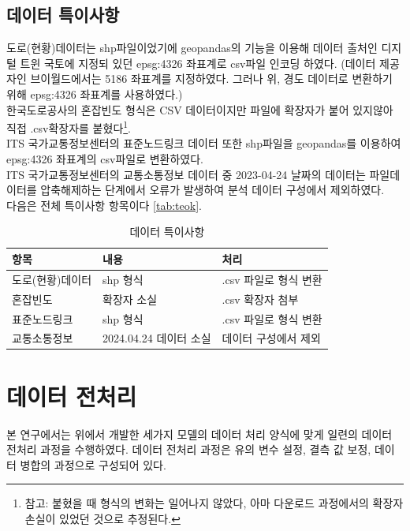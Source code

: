 \documentclass[11pt]{report}
\begin{document}
\subsection{데이터 특이사항}
도로(현황)데이터는 shp파일이었기에 geopandas의 기능을 이용해 데이터 출처인 디지털 트윈 국토에 지정되 있던 epsg:4326 좌표계로 csv파일 인코딩 하였다. 
(데이터 제공자인 브이월드에서는 5186 좌표계를 지정하였다. 그러나 위, 경도 데이터로 변환하기 위해 epsg:4326 좌표계를 사용하였다.) \\
\indent 한국도로공사의 혼잡빈도 형식은 CSV 데이터이지만 파일에 확장자가 붙어 있지않아 직접 .csv확장자를 붙혔다\footnote{참고: 붙혔을 때 형식의 변화는 일어나지 않았다, 아마 다운로드 과정에서의 확장자 손실이 있었던 것으로 추정된다.}. \\
\indent ITS 국가교통정보센터의 표준노드링크 데이터 또한 shp파일을 geopandas를 이용하여 epsg:4326 좌표계의 csv파일로 변환하였다. \\
\indent ITS 국가교통정보센터의 교통소통정보 데이터 중 2023-04-24 날짜의 데이터는 파일데이터를 압축해제하는 단계에서 오류가 발생하여 분석 데이터 구성에서 제외하였다. \\
\indent 다음은 전체 특이사항 항목이다 \autoref{tab:teok}. 

\begin{table}[H]
	\begin{center}
	\vspace{0.5cm}
	\begin{tabular}{|l|l|l|}
		\hline
		\rowcolor[HTML]{C0C0C0} 
		항목        & 내용                & 처리             \\ \hline
		도로(현황)데이터 & shp 형식            & .csv 파일로 형식 변환 \\ \hline
		혼잡빈도      & 확장자 소실            & .csv 확장자 첨부    \\ \hline
		표준노드링크    & shp 형식        & .csv 파일로 형식 변환 \\ \hline
		교통소통정보    & 2024.04.24 데이터 소실 & 데이터 구성에서 제외    \\ \hline
		\end{tabular}
	\end{center}
	\caption{데이터 특이사항}
	\label{tab:teok}
\end{table}

\section{데이터 전처리}
본 연구에서는 위에서 개발한 세가지 모델의 데이터 처리 양식에 맞게 일련의 데이터 전처리 과정을 수행하였다. 
데이터 전처리 과정은 유의 변수 설정, 결측 값 보정, 데이터 병합의 과정으로 구성되어 있다. 
\end{document}
